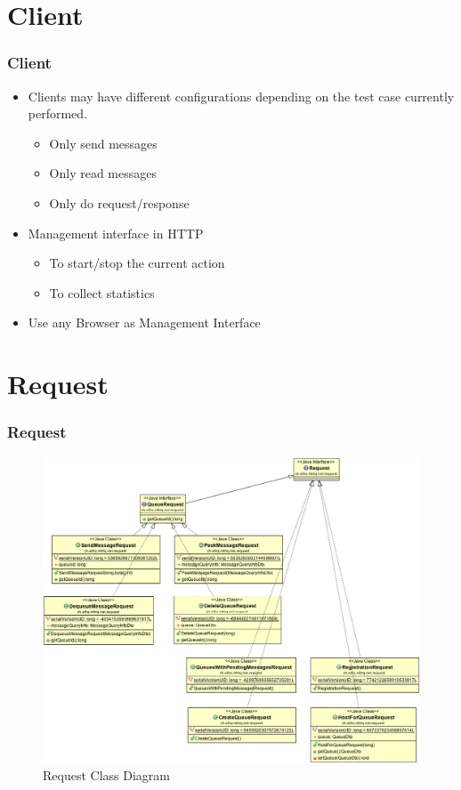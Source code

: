 \documentclass{beamer}
\begin{document}
\section{Client}
\begin{frame}
\frametitle{Client}
\begin{itemize}
\item Clients may have different configurations depending on the test case currently performed.
\begin{itemize}
\item{Only send messages}
\item{Only read messages}
\item{Only do request/response}
\end{itemize}

\item Management interface in HTTP
\begin{itemize}
\item{To start/stop the current action}
\item{To collect statistics}
\end{itemize}
\item Use any Browser as Management Interface
\end{itemize}
\end{frame}




\section{Request}
\begin{frame}
\frametitle{Request}

\begin{figure}
  \begin{center}
    \includegraphics[scale=0.25]{../../class_diagrams/Request.png}
  \end{center}
  \caption{Request Class Diagram}
  \label{fig:db-schema}
\end{figure}

\end{frame}
\end{document}
